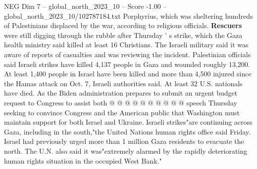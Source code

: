 \begin{textsample}{NEG Dim 7 – global\_north\_2023\_10 – Score -1.00 – global\_north\_2023\_10/102787184.txt}
Porphyrius, which was sheltering hundreds of Palestinians displaced by the war, according to religious officials. \textbf{Rescuers} were still digging through the rubble after Thursday ' s strike, which the Gaza health ministry said killed at least 16 Christians.
The Israeli military said it was aware of reports of casualties and was reviewing the incident.
Palestinian officials said Israeli strikes have killed 4,137 people in Gaza and wounded roughly 13,200.
At least 1,400 people in Israel have been killed and more than 4,500 injured since the Hamas attack on Oct. 7, Israeli authorities said.
At least 32 U.S. nationals have died.
As the Biden administration prepares to submit an urgent budget request to Congress to assist both @ @ @ @ @ @ @ @ @ @ speech Thursday seeking to convince Congress and the American public that Washington must maintain support for both Israel and Ukraine.
Israeli strikes"are continuing across Gaza, including in the south,"the United Nations human rights office said Friday.
Israel had previously urged more than 1 million Gaza residents to evacuate the north.
The U.N. also said it was"extremely alarmed by the rapidly deteriorating human rights situation in the occupied West Bank."

\end{textsample}
